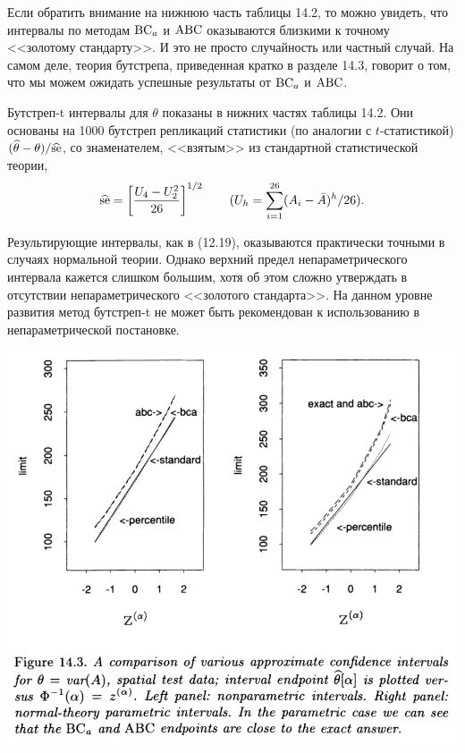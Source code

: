 Если обратить внимание на нижнюю часть таблицы 14.2, то можно увидеть, что интервалы по методам $\mathrm{BC}_a$ и $\mathrm{ABC}$ оказываются близкими к точному <<золотому стандарту>>. И это не просто случайность или частный случай. На самом деле, теория бутстрепа, приведенная кратко в разделе 14.3, говорит о том, что мы можем ожидать успешные результаты от $\mathrm{BC}_a$ и $\mathrm{ABC}$.

Бутстреп-t интервалы для $\theta$ показаны в нижних частях таблицы 14.2. Они основаны на 1000 бутстреп репликаций статистики (по аналогии с $t$-статистикой) $(\widehat{\theta} - \theta)/\widehat{\text{se}}$, со знаменателем, <<взятым>> из стандартной статистической теории,
\begin{equation}
  \widehat{\text{se}} = \left[ \frac{U_4 - U_2^2}{26}  \right]^{1/2} \qquad (U_h = \sum_{i = 1}^{26} (A_i - \bar A)^h/26).
\end{equation}

Результирующие интервалы, как в (12.19), оказываются практически точными в случаях нормальной теории. Однако верхний предел непараметрического интервала кажется слишком большим, хотя об этом сложно утверждать в отсутствии непараметрического <<золотого стандарта>>. На данном уровне развития метод бутстреп-t не может быть рекомендован к использованию в непараметрической постановке.

\includegraphics[width=0.85\linewidth]{14/f143.png}
\newline


